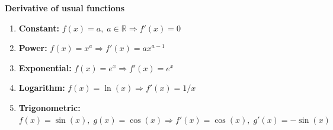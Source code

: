 \documentclass[11pt]{exam}
\newcommand{\R}{\mathbb{R}} %
\begin{document}
\begin{center}
    \textbf{Derivative of usual functions}
\end{center}

        \begin{enumerate}[leftmargin = 0.5cm, label = , rightmargin = 0.2cm]

        \item \textbf{Constant:} $f(x) = a,\; a \in\R \Longrightarrow f'(x) = 0$
        
        \item \textbf{Power:} $f(x) = x^a \Longrightarrow f'(x) = a x^{a-1}$
        

        \item \textbf{Exponential:} $f(x) = e^x \Longrightarrow f'(x) = e^x$

        \item \textbf{Logarithm:} $f(x) = \ln(x) \Longrightarrow f'(x) = 1/x$

        \item \textbf{Trigonometric:} $f(x) = \sin(x),\; g(x) = \cos(x) \Longrightarrow f'(x) = \cos(x),\; g'(x) = -\sin(x)$
        
        \end{enumerate}
\end{document}
